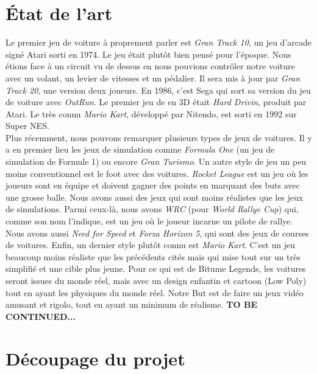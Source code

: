 \documentclass[11pt,a4paper]{article}
\begin{document}
{\section{État de l'art}
  Le premier jeu de voiture à proprement parler est \textit{Gran Track 10}, un jeu d'arcade signé Atari 
  sorti en 1974. Le jeu était plutôt bien pensé pour l'époque. Nous étions face à un 
  circuit vu de dessus en nous pouvions contrôler notre voiture avec un volant, un levier de vitesses
  et un pédalier. Il sera mis à jour par \textit{Gran Track 20}, une version deux joueurs.
  En 1986, c'est Sega qui sort sa version du jeu de voiture avec \textit{OutRun}. Le premier 
  jeu de en 3D était \textit{Hard Drivin}, produit par Atari. Le très connu \textit{Mario Kart},
  développé par Nitendo, est sorti en 1992 sur Super NES.\\
  \indent Plus récemment, nous pouvons remarquer plusieurs types de jeux de voitures. Il y a en premier lieu 
  les jeux de simulation comme \textit{Formula One} (un jeu de simulation de Formule 1) ou encore 
  \textit{Gran Turismo}. Un autre style de jeu un peu moins conventionnel est le foot avec des voitures. 
  \textit{Rocket League} est un jeu où les joueurs sont en équipe  et doivent gagner des
  points en marquant des buts avec une grosse balle. Nous avons aussi des jeux qui sont moins réalistes
  que les jeux de simulations. Parmi ceux-là, nous avons \textit{WRC} (pour \textit{World Rallye Cup})
  qui, comme son nom l'indique, est un jeu où le joueur incarne un pilote de rallye. Nous avons aussi 
  \textit{Need for Speed} et \textit{Forza Horizon 5}, qui sont des jeux de courses de voitures.
  Enfin, un dernier style plutôt connu est \textit{Mario Kart}. C'est un jeu beaucoup moins réaliste
  que les précédents cités mais qui mise tout sur un très simplifié et une cible plus jeune. 
  Pour ce qui est de Bitume Legends, les voitures seront issues du monde réel, mais avec un design
  enfantin et cartoon (Low Poly) tout en ayant les physiques du monde réel. Notre But est de faire 
  un jeux vidéo amusant et rigolo, tout en ayant un minimum de réalisme.
  \textbf{TO BE CONTINUED...}
\clearpage

\section{Découpage du projet}
}
\end{document}
